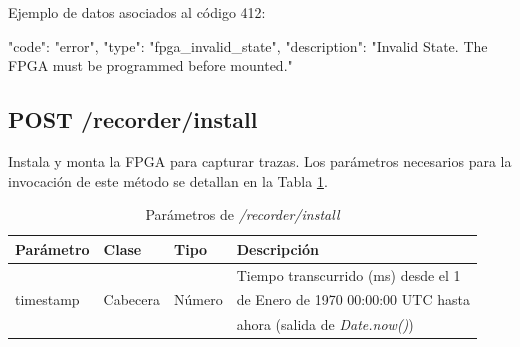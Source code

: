 \begin{itemize}
{\begin{minipage}{\textwidth}
Ejemplo de datos asociados al código 412:

\begin{code}[language=json]
{
  "code": "error",
  "type": "fpga_invalid_state",
  "description": "Invalid State. The FPGA must be programmed before mounted."
}
\end{code}
\end{minipage}
}

\end{itemize}

%
%
\subsection{POST /recorder/install}
Instala y monta la \gls{FPGA} para capturar \glspl{traza}. Los parámetros necesarios para la invocación de este método se detallan en la Tabla \ref{extra:api:recorderinstall:invocacion}.

\begin{table}[H]
\centering
\begin{tabular}{|l|l|l|l|}
\hline
\rowcolor[HTML]{F5F5F5}
\textbf{Parámetro}  & \textbf{Clase} & \textbf{Tipo} & \textbf{Descripción}                  \\ \hline
                    &                &               & Tiempo transcurrido (ms) desde el 1   \\
timestamp           & Cabecera       & Número        & de Enero de 1970 00:00:00 UTC hasta   \\
                    &                &               & ahora (salida de \textit{Date.now()}) \\ \hline
\end{tabular}
\caption{Parámetros de \textit{/recorder/install}}
\label{extra:api:recorderinstall:invocacion}
\end{table}

